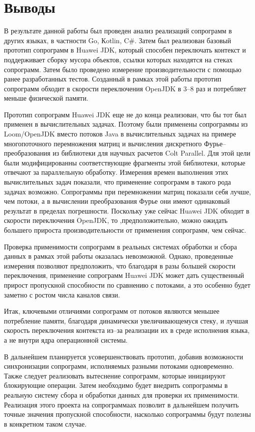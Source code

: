 \section{Выводы}
	В результате данной работы был проведен анализ реализаций сопрограмм в других языках, 
	в частности Go, Кotlin, C\#. Затем был реализован базовый прототип сопрограмм в
	Huawei JDK, который способен переключать контекст и поддерживает сборку мусора объектов, ссылки которых находятся
	на стеках сопрограмм. Затем было проведено измерение производительности с помощью ранее разработанных тестов.
	Созданный в рамках этой работы прототип сопрограмм обходит в скорости переключения
	OpenJDK в 3--8 раз и потребляет меньше физической памяти.
	\par
	Прототип сопрограмм Huawei JDK еще не до конца реализован, что бы тот был применен в вычислительных задачах.
	Поэтому были применены сопрограммы из Loom/OpenJDK вместо потоков Java в вычислительных задачах на
	примере многопоточного перемножения матриц и вычисления дискретного Фурье--преобразования 
	из библиотеки для научных расчетов Colt Parallel. Для этой цели были модифицированны соответствующие 
	фрагменты этой библиотеки, которые отвечают за параллельную обработку.
	Измерения времен выполнения этих вычислительных задач показали, что применение сопрограмм в 
	такого рода задачах возможно. Сопрограммы при перемножении матриц показали себя лучше,
	чем потоки, а в вычислении преобразования Фурье они имеют одинаковый результат в пределах погрешности.
	Поскольку уже сейчас Huawei JDK обходит в скорости переключения OpenJDK, то ,предположительно, можно ожидать
	большего прироста производительности от применения сопрограмм, чем сейчас.
	\par
	Проверка применимости сопрограмм в реальных системах обработки и сбора данных в рамках
	этой работы оказалась невозможной. Однако, проведенные измерения позволяют предположить,
	что благодаря в разы большей скорости переключения, применение сопрограмм Huawei JDK может дать 
	существенный прирост пропускной способности по сравнению с потоками, а это особенно будет заметно
	с ростом числа каналов связи. 
	\par
	Итак, ключевыми отличиями сопрограмм от потоков являются меньшее потребление памяти, благодаря
	динамически увеличивающемуся стеку, и лучшая скорость переключения контекста из--за реализации 
	их в среде исполнения языка, а не внутри ядра операционной системы.
	\par
	В дальнейшем планируется усовершенствовать прототип, добавив возможности синхронизации
	сопрограмм, исполняемых разными потоками одновременно. Также следует реализовать вытеснение сопрограмм, которые
	инициируют блокирующие операции.  
	Затем необходимо будет внедрить сопрограммы в реальную систему сбора и обработки данных для проверки их 
	применимости. Реализация этого проекта на сопрограммаах позволит в дальнейшем получить точные значения
	пропускной способности, насколько сопрограммы будут полезны в конкретном таком случае.
\clearpage
